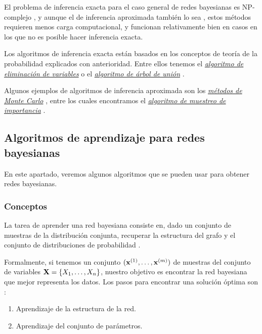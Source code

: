 El problema de inferencia exacta para el caso general de redes bayesianas es NP-complejo \cite{Cooper}, y 
aunque el de inferencia aproximada también lo sea \cite{Dagum}, estos métodos requieren menos 
carga computacional, y funcionan relativamente bien en casos en los que no es posible hacer inferencia exacta.

Los algoritmos de inferencia exacta \cite {ECastillo, pearl88} están basados en los conceptos de teoría 
de la probabilidad explicados con anterioridad. Entre ellos tenemos el \href{https://ermongroup.github.io/cs228-notes/inference/ve/}{\em 
algoritmo de eliminación de variables} o el \href{https://mjtsai1974.github.io/DevBlog/2018/10/14/bayesian-ml-clique-tree-construction/}{\em 
algoritmo de árbol de unión} \cite{clique-tree}. 

Algunos ejemplos de algoritmos de inferencia aproximada son los 
\href{http://www.sc.ehu.es/sbweb/fisica_/numerico/montecarlo/montecarlo.html}{\em métodos de Monte 
Carlo} \cite{Cano2004}, entre los cuales encontramos el \href{https://github.com/topics/importance-sampling}{\em algoritmo de muestreo de importancia} \cite{martinez}. 

\subsection{Algoritmos de aprendizaje para redes bayesianas}
En este apartado, veremos algunos algoritmos que se pueden usar para obtener redes bayesianas.
\subsubsection{Conceptos}
    
La tarea de aprender una red bayesiana consiste en, dado un conjunto de muestras de la distribución 
conjunta, recuperar la estructura del grafo y el conjunto de distribuciones de probabilidad \cite{different-algorithmic-schemes}.
    
Formalmente, si tenemos un conjunto $({\bf x}^{(1)}, \dots, {\bf x}^{(m)})$ de muestras del conjunto de variables 
${\bf X} = \{X_1, \dots, X_n\}$, nuestro objetivo es encontrar la red bayesiana que mejor representa los datos. Los 
pasos para encontrar una solución óptima son \cite{Cano2004}: 
\begin{enumerate}
    \item Aprendizaje de la estructura de la red.
    \item Aprendizaje del conjunto de parámetros. 
\end{enumerate}

